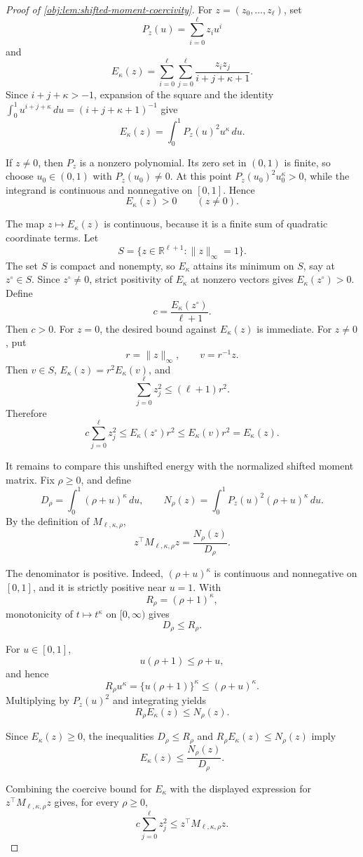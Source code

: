 \documentclass[11pt]{article}
\begin{document}
\begin{proof}[Proof of \cref{obj:lem:shifted-moment-coercivity}]
For \(z=(z_0,\ldots,z_\ell)\), set
\[
P_z(u)=\sum_{i=0}^{\ell}z_i u^i
\]
and
\[
E_\kappa(z)
=
\sum_{i=0}^{\ell}\sum_{j=0}^{\ell}
\frac{z_i z_j}{i+j+\kappa+1}.
\]
Since \(i+j+\kappa>-1\), expansion of the square and the identity
\(\int_0^1 u^{i+j+\kappa}\,du=(i+j+\kappa+1)^{-1}\) give
\[
E_\kappa(z)
=
\int_0^1 P_z(u)^2u^\kappa\,du .
\] %

If \(z\ne0\), then \(P_z\) is a nonzero polynomial. Its zero set in \((0,1)\) is finite, so choose \(u_0\in(0,1)\) with \(P_z(u_0)\ne0\). At this point
\(P_z(u_0)^2u_0^\kappa>0\), while the integrand is continuous and nonnegative on \([0,1]\). Hence
\[
E_\kappa(z)>0
\qquad (z\ne0).
\] %

The map \(z\mapsto E_\kappa(z)\) is continuous, because it is a finite sum of quadratic coordinate terms. Let
\[
S=\{z\in\mathbb R^{\ell+1}:\|z\|_\infty=1\}.
\]
The set \(S\) is compact and nonempty, so \(E_\kappa\) attains its minimum on \(S\), say at \(z^\circ\in S\). Since \(z^\circ\ne0\), strict positivity of \(E_\kappa\) at nonzero vectors gives \(E_\kappa(z^\circ)>0\). Define
\[
c=\frac{E_\kappa(z^\circ)}{\ell+1}.
\]
Then \(c>0\). For \(z=0\), the desired bound against \(E_\kappa(z)\) is immediate. For \(z\ne0\), put
\[
r=\|z\|_\infty,
\qquad
v=r^{-1}z .
\]
Then \(v\in S\), \(E_\kappa(z)=r^2E_\kappa(v)\), and
\[
\sum_{j=0}^{\ell}z_j^2\le(\ell+1)r^2.
\]
Therefore
\[
c\sum_{j=0}^{\ell}z_j^2
\le
E_\kappa(z^\circ)r^2
\le
E_\kappa(v)r^2
=
E_\kappa(z).
\] %

It remains to compare this unshifted energy with the normalized shifted moment matrix. Fix \(\rho\ge0\), and define
\[
D_\rho=\int_0^1(\rho+u)^\kappa\,du,
\qquad
N_\rho(z)=\int_0^1P_z(u)^2(\rho+u)^\kappa\,du .
\]
By the definition of \(M_{\ell,\kappa,\rho}\),
\[
z^\top M_{\ell,\kappa,\rho}z
=
\frac{N_\rho(z)}{D_\rho}.
\] %

The denominator is positive. Indeed, \((\rho+u)^\kappa\) is continuous and nonnegative on \([0,1]\), and it is strictly positive near \(u=1\). With
\[
R_\rho=(\rho+1)^\kappa,
\]
monotonicity of \(t\mapsto t^\kappa\) on \([0,\infty)\) gives
\[
D_\rho\le R_\rho .
\] %

For \(u\in[0,1]\),
\[
u(\rho+1)\le \rho+u,
\]
and hence
\[
R_\rho u^\kappa
=
\{u(\rho+1)\}^\kappa
\le
(\rho+u)^\kappa .
\]
Multiplying by \(P_z(u)^2\) and integrating yields
\[
R_\rho E_\kappa(z)
\le
N_\rho(z).
\] %

Since \(E_\kappa(z)\ge0\), the inequalities \(D_\rho\le R_\rho\) and
\(R_\rho E_\kappa(z)\le N_\rho(z)\) imply
\[
E_\kappa(z)\le \frac{N_\rho(z)}{D_\rho}.
\] %

Combining the coercive bound for \(E_\kappa\) with the displayed expression for
\(z^\top M_{\ell,\kappa,\rho}z\) gives, for every \(\rho\ge0\),
\[
c\sum_{j=0}^{\ell}z_j^2
\le
z^\top M_{\ell,\kappa,\rho}z .
\] %
\end{proof}
\end{document}
